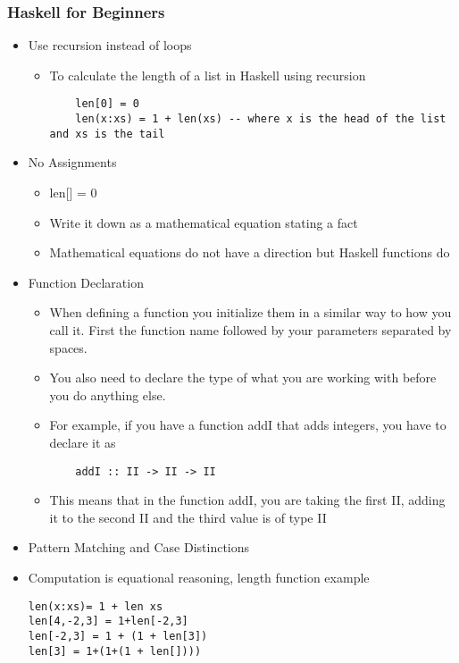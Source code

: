 \documentclass{article}
\begin{document}
\subsubsection{Haskell for Beginners}
\begin{itemize}
  \item Use recursion instead of loops
  \begin{itemize}
    \item To calculate the length of a list in Haskell using recursion
    \begin{lstlisting}
    len[0] = 0
    len(x:xs) = 1 + len(xs) -- where x is the head of the list and xs is the tail

\end{lstlisting}
    \end{itemize}
  \item No Assignments
  \begin{itemize}
    \item len[] = 0
    \item Write it down as a mathematical equation stating a fact
    \item Mathematical equations do not have a direction but Haskell functions do
   \end{itemize}
  \item Function Declaration
  \begin{itemize}
      \item When defining a function you initialize them in a similar way to how you call it. First the function name  followed by your parameters separated by spaces.
      \item You also need to declare the type of what you are working with before you do anything else.
      \item For example, if you have a function addI that adds integers, you have to declare it as
        \begin{lstlisting}
    addI :: II -> II -> II
\end{lstlisting}
      \item This means that in the function addI, you are taking the first II, adding it to the second II and the third value is of type II

  \end{itemize}



  \item Pattern Matching and Case Distinctions
  \item Computation is equational reasoning, length function example
    \begin{lstlisting}
len(x:xs)= 1 + len xs
len[4,-2,3] = 1+len[-2,3]
len[-2,3] = 1 + (1 + len[3])
len[3] = 1+(1+(1 + len[])))


\end{lstlisting}
\end{itemize}
\end{document}
